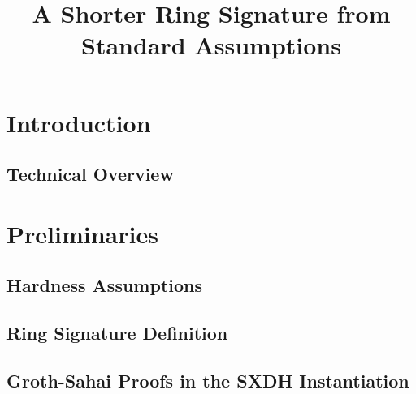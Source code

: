 \documentclass{llncs}
\title{A Shorter Ring Signature from Standard Assumptions}
\begin{document}
\maketitle

\begin{abstract}
    
\end{abstract} 

%

\section{Introduction}

     

   \subsection{Technical Overview} \label{sec:tech-overview}

	


    	



\section{Preliminaries}

	

	\subsection{Hardness Assumptions}

	

		\subsection{Ring Signature Definition}
    
            		

	\subsection{Groth-Sahai Proofs in the SXDH Instantiation} \label{sec:gs-proofs}
\end{document}
